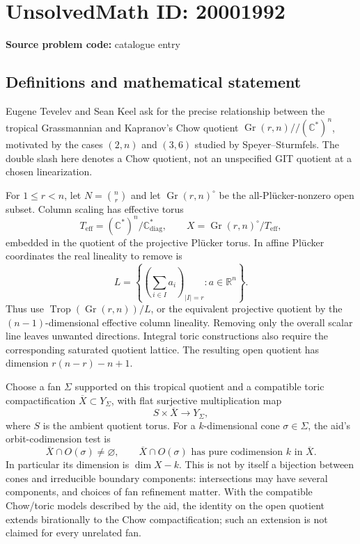 \documentclass[11pt]{article}
\newcommand{\R}{\mathbb{R}}
\newcommand{\C}{\mathbb{C}}
\begin{document}
\section*{UnsolvedMath ID: 20001992}
\textbf{Source problem code:} catalogue entry
\subsection{Definitions and mathematical statement}
Eugene Tevelev and Sean Keel ask for the precise relationship between the tropical Grassmannian and Kapranov's Chow quotient \(\operatorname{Gr}(r,n)//(\C^*)^n\), motivated by the cases \((2,n)\) and \((3,6)\) studied by Speyer--Sturmfels. The double slash here denotes a Chow quotient, not an unspecified GIT quotient at a chosen linearization.

For \(1\leq r<n\), let \(N=\binom nr\) and let \(\operatorname{Gr}(r,n)^\circ\) be the all-Plücker-nonzero open subset. Column scaling has effective torus
\[
 T_{\mathrm{eff}}=(\C^*)^n/\C^*_{\mathrm{diag}},\qquad
 X=\operatorname{Gr}(r,n)^\circ/T_{\mathrm{eff}},
\]
embedded in the quotient of the projective Plücker torus. In affine Plücker coordinates the real lineality to remove is
\[
 L=\left\{\left(\sum_{i\in I}a_i\right)_{|I|=r}:a\in\R^n\right\}.
\]
Thus use \(\operatorname{Trop}(\operatorname{Gr}(r,n))/L\), or the equivalent projective quotient by the \((n-1)\)-dimensional effective column lineality. Removing only the overall scalar line leaves unwanted directions. Integral toric constructions also require the corresponding saturated quotient lattice. The resulting open quotient has dimension \(r(n-r)-n+1\).

Choose a fan \(\Sigma\) supported on this tropical quotient and a compatible toric compactification \(\overline X\subset Y_\Sigma\), with flat surjective multiplication map
\[
 S\times\overline X\longrightarrow Y_\Sigma,
\]
where \(S\) is the ambient quotient torus. For a \(k\)-dimensional cone \(\sigma\in\Sigma\), the aid's orbit-codimension test is
\[
 \overline X\cap O(\sigma)\ne\varnothing,
 \qquad\overline X\cap O(\sigma)
 \text{ has pure codimension }k\text{ in }\overline X.
\]
In particular its dimension is \(\dim X-k\). This is not by itself a bijection between cones and irreducible boundary components: intersections may have several components, and choices of fan refinement matter. With the compatible Chow/toric models described by the aid, the identity on the open quotient extends birationally to the Chow compactification; such an extension is not claimed for every unrelated fan.
\end{document}
